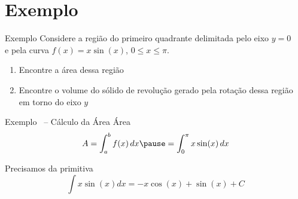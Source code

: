 %

\addtocounter{exemplo}{1}
\section{Exemplo \theexemplo}

\begin{frame}{Exemplo \theexemplo}
Considere a região do primeiro quadrante delimitada pelo eixo $y=0$\\
e pela curva $f(x)=x \sin(x)$, $0 \leq x \leq \pi$.
\begin{enumerate}
  \item Encontre a área dessa região
  \item Encontre o volume do sólido de revolução gerado pela
  rotação dessa região em torno do eixo $y$
\end{enumerate}
\end{frame}


\begin{frame}{Exemplo \theexemplo\ -- Cálculo da Área}
Área
\[
  A
  = \int_a^b f(x)\,dx
  \pause
  = \int_0^{\pi} x\sin(x)\,dx
\]

\pause
Precisamos da primitiva
\[
  \int x\sin(x)dx = -x \cos(x) + \sin(x)  + C
\]
\end{frame}

